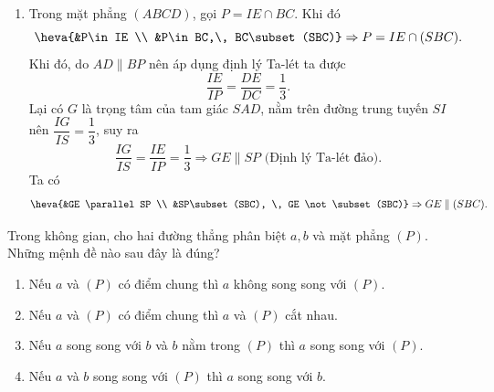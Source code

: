 \begin{bt}
\begin{ex}[Mức độ 3]
{\begin{enumerate}
			\item Trong mặt phẳng $(ABCD)$, gọi $P = IE\cap BC$. Khi đó\\
			$$\heva{&P\in IE \\ &P\in BC,\, BC\subset (SBC)} \Rightarrow P = IE \cap (SBC).$$ 
			Khi đó, do $AD \parallel BP$ nên áp dụng định lý Ta-lét ta được $$\dfrac{IE}{IP} = \dfrac{DE}{DC} = \dfrac{1}{3}.$$ 
			Lại có $G$ là trọng tâm của tam giác $SAD$, nằm trên đường trung tuyến $SI$ nên $\dfrac{IG}{IS} = \dfrac{1}{3}$, suy ra
			$$\dfrac{IG}{IS} = \dfrac{IE}{IP}=\dfrac{1}{3} \Rightarrow GE \parallel SP \text{ (Định lý Ta-lét đảo).}$$
			Ta có $$ \heva{&GE \parallel SP \\ &SP\subset (SBC), \, GE \not\subset (SBC)} \Rightarrow GE \parallel (SBC).$$
		\end{enumerate}
	}
\end{ex}

\begin{ex}%
	[KNTT]
	Trong không gian, cho hai đường thẳng phân biệt $a, b$ và mặt phẳng $(P)$. Những mệnh đề nào sau đây là đúng?
	\begin{enumerate} 
		\item[a)] Nếu $ a $ và $(P)$ có điểm chung thì $ a $ không song song với $(P)$.
		\item[b)] Nếu $ a $ và $(P)$ có điểm chung thì $ a $ và $(P)$ cắt nhau.
		\item[c)] Nếu $ a $ song song với $ b$ và $ b$ nằm trong $(P)$ thì $ a $ song song với $(P)$.
		\item[d)] Nếu $ a$ và $ b$ song song với $(P)$ thì $ a $ song song với $ b$.
	\end{enumerate}
\end{ex}


\end{bt}
